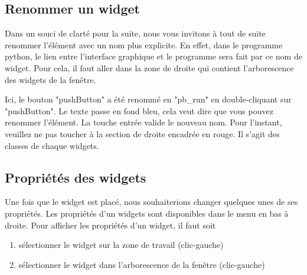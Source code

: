 {

\subsection{Renommer un widget}

Dans un souci de clarté pour la suite, nous vous invitons à tout de suite renommer l'élément avec un nom plus explicite. \newline
{\color{red}En effet, dans le programme python, le lien entre l'interface graphique et le programme sera fait par ce nom de widget.} \newline 
Pour cela, il faut aller dans la zone de droite qui contient l'arborescence des widgets de la fenêtre.



Ici, le bouton "pushButton" a été renommé en "pb\_run" en double-cliquant sur "pushButton". Le texte passe en fond bleu, cela veut dire que vous pouvez renommer l'élément. La touche entrée valide le nouveau nom. \newline
Pour l'instant, veuillez ne pas toucher à la section de droite encadrée en rouge. Il s'agit des classes de chaque widgets. 



\subsection{Propriétés des widgets}

Une fois que le widget est placé, nous souhaiterions changer quelques unes de ses propriétés. \newline
Les propriétés d'un widgets sont disponibles dans le menu en bas à droite.
Pour afficher les propriétés d'un widget, il faut soit
\begin{enumerate}
    \item sélectionner le widget sur la zone de travail (clic-gauche)
    \item sélectionner le widget dans l'arborescence de la fenêtre (clic-gauche)
\end{enumerate}



}
